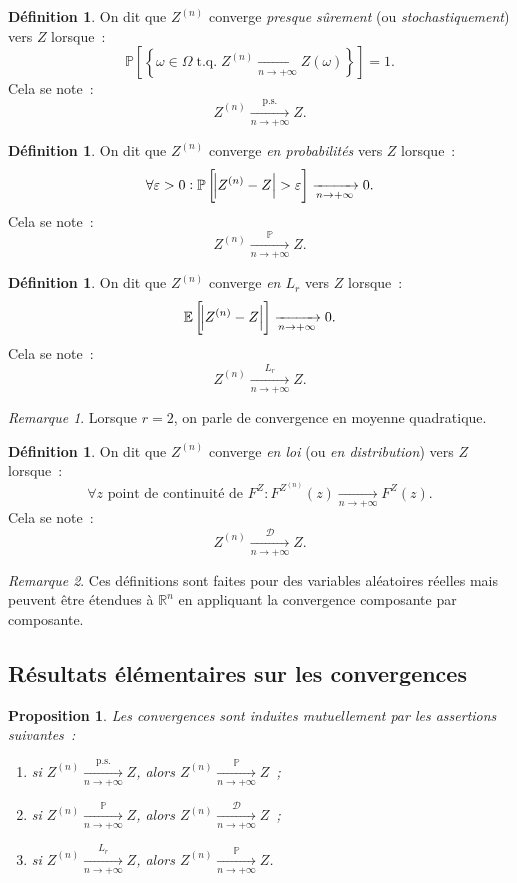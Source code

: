 \documentclass{report}
\DeclareMathOperator{\tq}{\text{ t.q. }}
\renewcommand{\P}{\mathbb P}
\newcommand{\E}{\mathbb E}
\newcommand{\pinfty}{{+\infty}}
\newcommand{\cvgp}{\xrightarrow[n \to \pinfty]{\P}}
\newcommand{\cvgLr}{\xrightarrow[n \to \pinfty]{L_r}}
\newcommand{\cvgd}{\xrightarrow[n \to \pinfty]{\mathcal D}}
\newcommand{\ps}{{\text{p.s.}}}
\newcommand{\cvgps}{\xrightarrow[n \to \pinfty]\ps}
\newcommand{\R}{\mathbb R}
\newtheorem{prp}[thm]{Proposition}
\theoremstyle{definition}
\newtheorem{déf}[thm]{Définition}
\theoremstyle{remark}
\newtheorem*{rmq}{Remarque}
\begin{document}
			\begin{déf} On dit que $Z^{(n)}$ converge \textit{presque sûrement} (ou \textit{stochastiquement}) vers $Z$ lorsque~:
			\[\P\left[\left\{\omega \in \Omega \tq Z^{(n)} \xrightarrow[n \to \pinfty]{} Z(\omega)\right\}\right] = 1.\]
			Cela se note~:
			\[Z^{(n)} \cvgps Z.\]
			\end{déf}

			\begin{déf} On dit que $Z^{(n)}$ converge \textit{en probabilités} vers $Z$ lorsque~:
			\[\forall \varepsilon > 0 : \P\left[\abs {Z^{(n)} - Z} > \varepsilon\right] \xrightarrow[n \to \pinfty]{} 0.\]
			Cela se note~:
			\[Z^{(n)} \cvgp Z.\]
			\end{déf}

			\begin{déf} On dit que $Z^{(n)}$ converge \textit{en $L_r$} vers $Z$ lorsque~:
			\[\E\left[\abs {Z^{(n)} - Z}\right] \xrightarrow[n \to \pinfty]{} 0.\]
			Cela se note~:
			\[Z^{(n)} \cvgLr Z.\]
			\end{déf}

			\begin{rmq} Lorsque $r=2$, on parle de convergence en moyenne quadratique.
			\end{rmq}

			\begin{déf} On dit que $Z^{(n)}$ converge \textit{en loi} (ou \textit{en distribution}) vers $Z$ lorsque~:
			\[\forall z \text{ point de continuité de }F^Z : F^{Z^{(n)}}(z) \xrightarrow[n \to \pinfty]{} F^Z(z).\]
			Cela se note~:
			\[Z^{(n)} \cvgd Z.\]
			\end{déf}

			\begin{rmq} Ces définitions sont faites pour des variables aléatoires réelles mais peuvent être étendues à $\R^n$ en appliquant la convergence composante
			par composante.
			\end{rmq}

		\subsection{Résultats élémentaires sur les convergences}
			\begin{prp} Les convergences sont induites mutuellement par les assertions suivantes~:
			\begin{enumerate}
				\item si $Z^{(n)} \cvgps Z$, alors $Z^{(n)} \cvgp Z$~;
				\item si $Z^{(n)} \cvgp Z$, alors $Z^{(n)} \cvgd Z$~;
				\item si $Z^{(n)} \cvgLr Z$, alors $Z^{(n)} \cvgp Z$.
			\end{enumerate}
			\end{prp}
\end{document}

